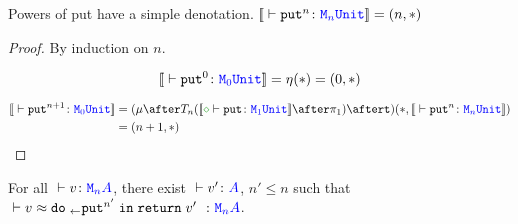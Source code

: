 \documentclass{Report}
\begin{document}
\begin{lemma}
    Powers of put have a simple denotation.
$\deno{\ztyperelation{\put^n}{\M{n}{\U}}} = (n, \singleton)$    
\end{lemma}

\begin{proof}
    By induction on $n$.

    
    \begin{equation}
        \deno{\ztyperelation{\put^0}{\M{0}{\U}}} = \point{}(\singleton) = (0, \singleton)
    \end{equation}
    
    \begin{align}
        \deno{\ztyperelation{\put^{n+1}}{\M{0}{\U}}} & = (\bindmu\after\T{n}{(\deno{\typerelation{\nil}{\put}{\M{1}{\U}}}\after\p)}\after \strengtht)(\singleton, \deno{\ztyperelation{\put^n}{\M{n}{\U}}})\\
        & = (n+1, \singleton)
    \end{align}
\end{proof}

\begin{theorem}
    For all $\ztyperelation{v}{\mna}$, there exist $\ztyperelation{v'}{A}$, $n' \leq n$ such that $\zberelation{v}{\doin{_}{\put^{n'}}{\return{v'}}}{\mna}$.
\end{theorem}
\end{document}
